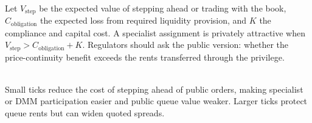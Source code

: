 \begin{model} \\
Let $V_{\mathrm{step}}$ be the expected value of stepping ahead or trading with the book, $C_{\mathrm{obligation}}$ the expected loss from required liquidity provision, and $K$ the compliance and capital cost. A specialist assignment is privately attractive when $V_{\mathrm{step}}>C_{\mathrm{obligation}}+K$.
Regulators should ask the public version: whether the price-continuity benefit exceeds the rents transferred through the privilege.
\end{model}

\begin{caveat} \\
Small ticks reduce the cost of stepping ahead of public orders, making specialist or DMM participation easier and public queue value weaker. Larger ticks protect queue rents but can widen quoted spreads.
\end{caveat}
